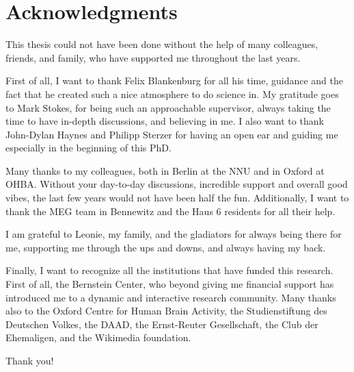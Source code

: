 
\chapter*{Acknowledgments}
\doublespacing
This thesis could not have been done without the help of many colleagues, friends, and family, who have supported me throughout the last years. 

First of all, I want to thank Felix Blankenburg for all his time, guidance and the fact that he created such a nice atmosphere to do science in. My gratitude goes to Mark Stokes, for being such an approachable supervisor, always taking the time to have in-depth discussions, and believing in me. I also want to thank John-Dylan Haynes and Philipp Sterzer for having an open ear and guiding me especially in the beginning of this PhD.

Many thanks to my colleagues, both in Berlin at the NNU and in Oxford at OHBA. Without your day-to-day discussions, incredible support and overall good vibes, the last few years would not have been half the fun.
Additionally, I want to thank the MEG team in Bennewitz and the Haus 6 residents for all their help.

I am grateful to Leonie, my family, and the gladiators for always being there for me, supporting me through the ups and downs, and always having my back.

Finally, I want to recognize all the institutions that have funded this research. First of all, the Bernstein Center, who beyond giving me financial support has introduced me to a dynamic and interactive research community. Many thanks also to the Oxford Centre for Human Brain Activity, the Studienstiftung des Deutschen Volkes, the DAAD, the Ernst-Reuter Gesellschaft, the Club der Ehemaligen, and the Wikimedia foundation. 

Thank you!
